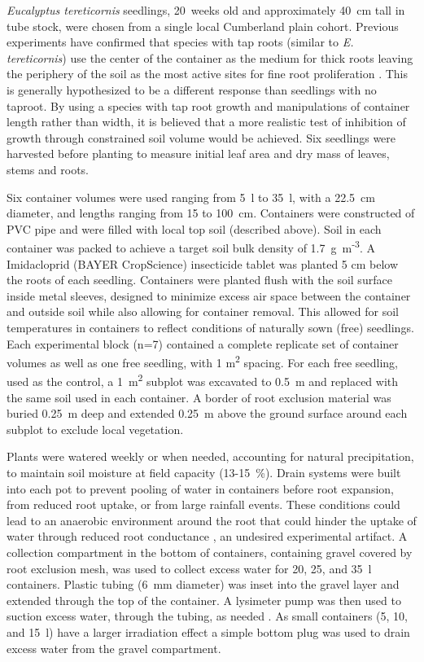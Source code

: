 \documentclass[a4paper]{article}\usepackage[]{graphicx}\usepackage[]{color}
\begin{document}
\textit{Eucalyptus tereticornis} seedlings, 20~weeks old and approximately 40~cm tall in tube stock, were chosen from a single local Cumberland plain cohort. Previous experiments have confirmed that species with tap roots (similar to \textit{E. tereticornis}) use the center of the container as the medium for thick roots leaving the periphery of the soil as the most active sites for fine root proliferation \citep{biran1980a,biran1980b}. This is generally hypothesized to be a different response than seedlings with no taproot. By using a species with tap root growth and manipulations of container length rather than width, it is believed that a more realistic test of inhibition of growth through constrained soil volume would be achieved. Six seedlings were harvested before planting to measure initial leaf area and dry mass of leaves, stems and roots.

Six container volumes were used ranging from 5~l to 35~l, with a 22.5~cm diameter, and lengths ranging from 15 to 100~cm. Containers were constructed of PVC pipe and were filled with local top soil (described above). Soil in each container was packed to achieve a target soil bulk density of 1.7~g~m\textsuperscript{-3}. A Imidacloprid (BAYER CropScience) insecticide tablet was planted 5 cm below the roots of each seedling. Containers were planted flush with the soil surface inside metal sleeves, designed to minimize excess air space between the container and outside soil while also allowing for container removal. This allowed for soil temperatures in containers to reflect conditions of naturally sown (free) seedlings. Each experimental block (n=7) contained a complete replicate set of container volumes as well as one free seedling, with 1 m\textsuperscript{2} spacing. For each free seedling, used as the control, a 1~m\textsuperscript{2} subplot was excavated to 0.5~m and replaced with the same soil used in each container. A border of root exclusion material was buried 0.25~m deep and extended 0.25~m above the ground surface around each subplot to exclude local vegetation.

Plants were watered weekly or when needed, accounting for natural precipitation, to maintain soil moisture at field capacity (13-15~\%). Drain systems were built into each pot to prevent pooling of water in containers before root expansion, from reduced root uptake, or from large rainfall events. These conditions could lead to an anaerobic environment around the root that could hinder the uptake of water through reduced root conductance \citep{poorter2009causes}, an undesired experimental artifact. A collection compartment in the bottom of containers, containing gravel covered by root exclusion mesh, was used to collect excess water for 20, 25, and 35~l containers. Plastic tubing (6~mm diameter) was inset into the gravel layer and extended through the top of the container. A lysimeter pump was then used to suction excess water, through the tubing, as needed . As small containers (5, 10, and 15~l) have a larger irradiation effect a simple bottom plug was used to drain excess water from the gravel compartment.  
\end{document}
